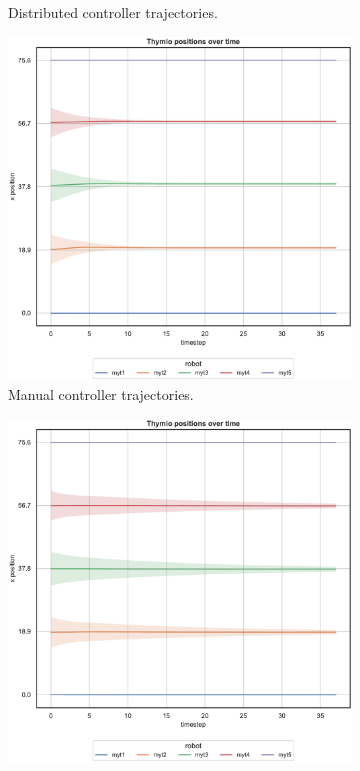 \begin{figure}[!htb]
\begin{center}
\begin{subfigure}[h]{0.49\textwidth}
			\caption{Distributed controller trajectories.}
		\end{subfigure}
	\end{center}
	\begin{center}
		\begin{subfigure}[h]{0.49\textwidth}
			\centering
			\includegraphics[width=.9\textwidth]{contents/images/net-d1/position-overtime-manual}%
			\caption{Manual controller trajectories.}
		\end{subfigure}
		\hfill
		\begin{subfigure}[h]{0.49\textwidth}
			\centering
			\includegraphics[width=.9\textwidth]{contents/images/net-d1/position-overtime-learned_distributed}

\end{subfigure}
\end{center}
\end{figure}
